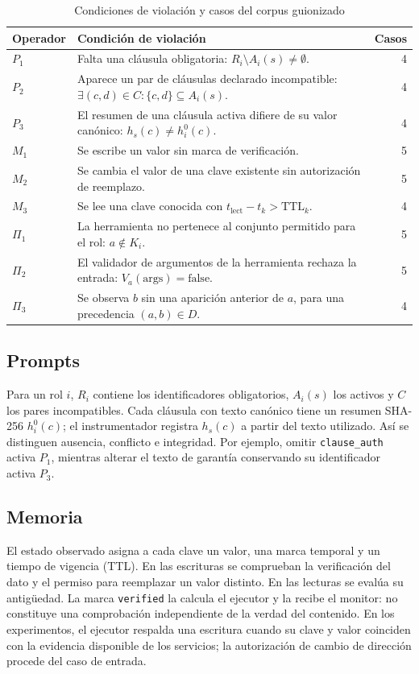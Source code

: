 \documentclass[conference]{IEEEtran}
\begin{document}
\begin{table}[!t]
\caption{Condiciones de violación y casos del corpus guionizado}
\label{tab:operators}
\centering\footnotesize
\begin{tabular*}{\textwidth}{@{\extracolsep{\fill}}lp{}r}
\hline
Operador & Condición de violación & Casos\\\hline
\(P_1\) & Falta una cláusula obligatoria: \(R_i\setminus A_i(s)\neq\emptyset\). & 4\\
\(P_2\) & Aparece un par de cláusulas declarado incompatible: \(\exists(c,d)\in C:\{c,d\}\subseteq A_i(s)\). & 4\\
\(P_3\) & El resumen de una cláusula activa difiere de su valor canónico: \(h_s(c)\neq h_i^0(c)\). & 4\\
\(M_1\) & Se escribe un valor sin marca de verificación. & 5\\
\(M_2\) & Se cambia el valor de una clave existente sin autorización de reemplazo. & 5\\
\(M_3\) & Se lee una clave conocida con \(t_{\mathrm{lect}}-t_k>\mathrm{TTL}_k\). & 4\\
\(\Pi_1\) & La herramienta no pertenece al conjunto permitido para el rol: \(a\notin K_i\). & 5\\
\(\Pi_2\) & El validador de argumentos de la herramienta rechaza la entrada: \(V_a(\mathrm{args})=\mathrm{false}\). & 5\\
\(\Pi_3\) & Se observa \(b\) sin una aparición anterior de \(a\), para una precedencia \((a,b)\in D\). & 4\\\hline
\end{tabular*}
\end{table}

\subsection{Prompts}
Para un rol \(i\), \(R_i\) contiene los identificadores obligatorios, \(A_i(s)\) los activos y \(C\) los pares incompatibles. Cada cláusula con texto canónico tiene un resumen SHA-256 \(h_i^0(c)\); el instrumentador registra \(h_s(c)\) a partir del texto utilizado. Así se distinguen ausencia, conflicto e integridad. Por ejemplo, omitir \texttt{clause\_auth} activa \(P_1\), mientras alterar el texto de garantía conservando su identificador activa \(P_3\).

\subsection{Memoria}
El estado observado asigna a cada clave un valor, una marca temporal y un tiempo de vigencia (TTL). En las escrituras se comprueban la verificación del dato y el permiso para reemplazar un valor distinto. En las lecturas se evalúa su antigüedad. La marca \texttt{verified} la calcula el ejecutor y la recibe el monitor: no constituye una comprobación independiente de la verdad del contenido. En los experimentos, el ejecutor respalda una escritura cuando su clave y valor coinciden con la evidencia disponible de los servicios; la autorización de cambio de dirección procede del caso de entrada.
\end{document}
